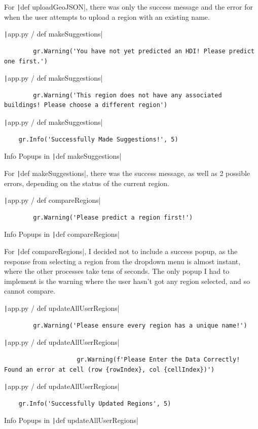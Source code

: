 \documentclass[12pt]{report}
\newcommand{\pil}[1]{\protect\texttt|#1|}
\begin{document}
For \pil{def uploadGeoJSON}, there was only the success message and the error for when the user attempts to upload a region with an existing name.

\begin{listing}[H]
\pil{app.py / def makeSuggestions}
\begin{verbatim}
        gr.Warning('You have not yet predicted an HDI! Please predict one first.')
\end{verbatim}
\pil{app.py / def makeSuggestions}
\begin{verbatim}
        gr.Warning('This region does not have any associated buildings! Please choose a different region')
\end{verbatim}
\pil{app.py / def makeSuggestions}
\begin{verbatim}
    gr.Info('Successfully Made Suggestions!', 5)
\end{verbatim}
\caption{Info Popups in \pil{def makeSuggestions}}\label{cs:infoPopups3}
\end{listing}

For \pil{def makeSuggestions}, there was the success message, as well as 2 possible errors, depending on the status of the current region.

\begin{listing}[H]
\pil{app.py / def compareRegions}
\begin{verbatim}
        gr.Warning('Please predict a region first!')
\end{verbatim}
\caption{Info Popups in \pil{def compareRegions}}\label{cs:infoPopups4}
\end{listing}

For \pil{def compareRegions}, I decided not to include a success popup, as the response from selecting a region from the dropdown menu is almost instant, where the other processes take tens of seconds. The only popup I had to implement is the warning where the user hasn't got any region selected, and so cannot compare.

\begin{listing}[H]
\pil{app.py / def updateAllUserRegions}
\begin{verbatim}
        gr.Warning('Please ensure every region has a unique name!')
\end{verbatim}
\pil{app.py / def updateAllUserRegions}
\begin{verbatim}
                    gr.Warning(f'Please Enter the Data Correctly! Found an error at cell (row {rowIndex}, col {cellIndex})')
\end{verbatim}
\pil{app.py / def updateAllUserRegions}
\begin{verbatim}
    gr.Info('Successfully Updated Regions', 5)
\end{verbatim}
\caption{Info Popups in \pil{def updateAllUserRegions}}\label{cs:infoPopups5}
\end{listing}
\end{document}
